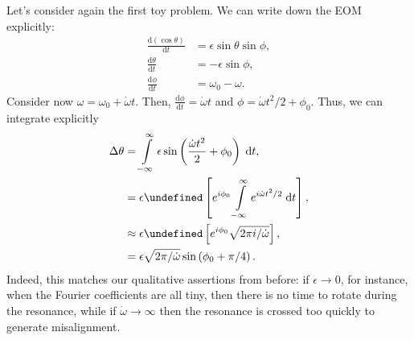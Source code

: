 \documentclass[11pt,
        usenames, %
        dvipsnames %
    ]{article}
\newcommand*{\rd}[2]{\frac{\mathrm{d}#1}{\mathrm{d}#2}}
\newcommand*{\bm}[1]{\boldsymbol{\mathbf{#1}}}
\newcommand*{\uv}[1]{\hat{\bm{#1}}}
\let\Im\undefined
\DeclareMathOperator{\Im}{Im}
\newcommand*{\p}[1]{\left(#1\right)}
\newcommand*{\s}[1]{\left[#1\right]}
\begin{document}
Let's consider again the first toy problem. We can write down the EOM
explicitly:
\begin{align}
    \rd{(\cos \theta)}{t} &= \epsilon \sin \theta \sin \phi,\\
    \rd{\theta}{t} &= -\epsilon \sin \phi,\\
    \rd{\phi}{t} &= \omega_0 - \omega.
\end{align}
Consider now $\omega = \omega_0 + \dot{\omega}t$. Then, $\rd{\phi}{t} =
\dot{\omega}t$ and $\phi = \dot{\omega}t^2/2 + \phi_0$. Thus, we can integrate
explicitly
\begin{align}
    \Delta \theta &= \int\limits_{-\infty}^\infty
            \epsilon \sin \p{\frac{\dot{\omega}t^2}{2} + \phi_0}
                \;\mathrm{d}t,\\
        &= \epsilon \Im\s{e^{i\phi_0}\int\limits_{-\infty}^\infty
            e^{i\dot{\omega}t^2/2}\;\mathrm{d}t},\\
        &\approx \epsilon \Im \s{e^{i\phi_0}\sqrt{2\pi i/\dot{\omega}}},\\
        &= \epsilon \sqrt{2\pi/\dot{\omega}}\sin\p{\phi_0 + \pi/4}.
\end{align}
Indeed, this matches our qualitative assertions from before: if $\epsilon \to
0$, for instance, when the Fourier coefficients are all tiny, then there is no
time to rotate during the resonance, while if $\dot{\omega} \to \infty$ then the
resonance is crossed too quickly to generate misalignment.


\end{document}
